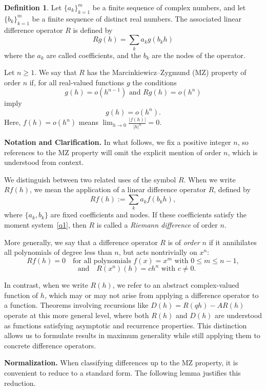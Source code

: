 \documentclass{raex}
\theoremstyle{definition}
\newtheorem{definition}[theorem]{Definition}
\begin{document}
\begin{definition} Let $\{a_k\}_{k=1}^m$ be a finite  sequence of complex numbers,  and let $\{b_k\}_{k=1}^m
$ be a finite sequence of distinct real numbers. The associated linear difference operator $R$ is defined by
\[
Rg(h) = \sum_k a_k g(b_k h)
\] where the $a_k$ are called coefficients, and the $b_k$ are the nodes of the operator.

\noindent Let $n\geq 1$. We say that $R$ has the Marcinkiewicz–Zygmund (MZ) property of order $n$ if, for all real-valued functions $g$ the conditions \[g(h) = o(h^{n-1}) \text{ and } Rg(h) = o(h^n)\] imply \[g(h) = o(h^n).\] Here,  \( f(h) = o(h^n) \) means $\lim_{h \to 0} \frac{|f(h)|}{|h|^n} = 0.$

\end{definition}

\noindent\textbf{Notation and Clarification.} 
In what follows, we fix a positive integer $n$, so references to the MZ property will omit the explicit mention of order $n$, which is understood from context.

 We distinguish between two related uses of the symbol \( R \). When we write \( Rf(h) \), we mean the application of a linear difference operator \( R \), defined by
\[
Rf(h) := \sum_k a_k f(b_k h),
\]
where \( \{a_k, b_k\} \) are fixed coefficients and nodes. If these coefficients satisfy the moment system~\eqref{q1}, then \( R \) is called a \emph{Riemann difference} of order \( n \).

More generally, we say that a difference operator \( R \) is of \emph{order \( n \)} if it annihilates all polynomials of degree less than \( n \), but acts nontrivially on \( x^n \):
\[
Rf(h) = 0 \quad \text{for all polynomials } f(x) = x^m \text{ with } 0 \leq m \leq n-1,\]\[ \quad \text{and} \quad R(x^n)(h) = c h^n \text{ with } c \neq 0.
\]

In contrast, when we write \( R(h) \), we refer to an abstract complex-valued function of \( h \), which may or may not arise from applying a difference operator to a function. Theorems involving recursions like \( D(h) = R(qh) - A R(h) \) operate at this more general level, where both \( R(h) \) and \( D(h) \) are understood as functions satisfying asymptotic and recurrence properties. This distinction allows us to formulate results in maximum generality while still applying them to concrete difference operators.

\medskip
\noindent\textbf{Normalization.}
When classifying differences up to the MZ property, it is convenient to reduce to a standard form. The following lemma justifies this reduction.
\end{document}
